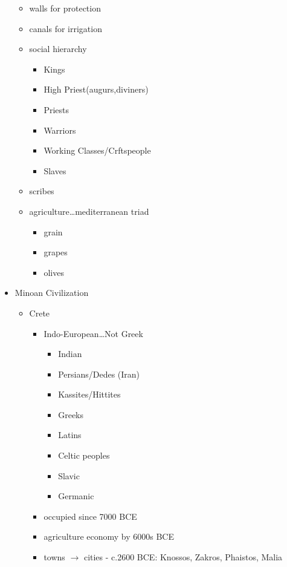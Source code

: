 \documentclass[11pt, a4paper]{article}
\begin{document}
\begin{itemize}
\begin{itemize}
          \item walls for protection
          \item canals for irrigation
          \item social hierarchy
            \begin{itemize}
              \item Kings
              \item High Priest(augurs,diviners)
              \item Priests
              \item Warriors
              \item Working Classes/Crftspeople
              \item Slaves
            \end{itemize}
          \item scribes
          \item agriculture\dots mediterranean triad
            \begin{itemize}
              \item grain
              \item grapes
              \item olives
            \end{itemize}
        \end{itemize}
  \item Minoan Civilization
    \begin{itemize}
      \item Crete
        \begin{itemize}
          \item Indo-European\dots Not Greek
            \begin{itemize}
              \item Indian
              \item Persians/Dedes (Iran)
              \item Kassites/Hittites
              \item Greeks
              \item Latins
              \item Celtic peoples
              \item Slavic
              \item Germanic
            \end{itemize}
          \item occupied since 7000 BCE
          \item agriculture economy by 6000s BCE
          \item towns $\rightarrow$ cities - c.2600 BCE: Knossos, Zakros, Phaistos, Malia

\end{itemize}
\end{itemize}
\end{itemize}
\end{document}
